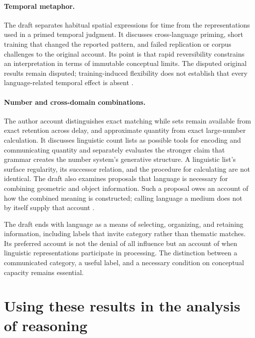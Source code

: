 \paragraph{Temporal metaphor.}
The draft separates habitual spatial expressions for time from the
representations used in a primed temporal judgment. It discusses
cross-language priming, short training that changed the reported pattern,
and failed replication or corpus challenges to the original account.
Its point is that rapid reversibility constrains an interpretation in
terms of immutable conceptual limits. The disputed original results
remain disputed; training-induced flexibility does not establish that
every language-related temporal effect is absent
\cite[author-draft pp.~43--44]{GleitmanPapafragouLanguageThoughtAuthorDraftLC}.

\paragraph{Number and cross-domain combinations.}
The author account distinguishes exact matching while sets remain available
from exact retention across delay, and approximate quantity from exact
large-number calculation. It discusses linguistic count lists as possible
tools for encoding and communicating quantity and separately evaluates
the stronger claim that grammar creates the number system's generative
structure. A linguistic list's surface regularity, its successor relation,
and the procedure for calculating are not identical. The draft also
examines proposals that language is necessary for combining geometric
and object information. Such a proposal owes an account of how the
combined meaning is constructed; calling language a medium does not
by itself supply that account
\cite[author-draft pp.~44--56]{GleitmanPapafragouLanguageThoughtAuthorDraftLC}.

The draft ends with language as a means of selecting, organizing, and
retaining information, including labels that invite category rather than
thematic matches. Its preferred account is not the denial of all influence
but an account of when linguistic representations participate in processing.
The distinction between a communicated category, a useful label, and a
necessary condition on conceptual capacity remains essential.

\section{Using these results in the analysis of reasoning}
\label{sec:p19-lc-use}

